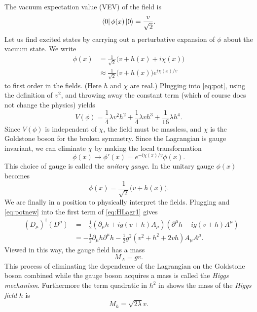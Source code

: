 The vacuum expectation value (VEV) of the field is
\begin{equation}
  \bra{0}\phi(x)\ket{0}=\frac{v}{\sqrt{2}}.
\end{equation}
Let us find excited states by carrying out a perturbative expansion of $\phi$ 
about the vacuum state. We write
\begin{equation}
  \label{eq:phixpand}
  \begin{aligned}
  \phi(x)&=\frac{1}{\sqrt{2}}\big(v+h(x)+i\chi(x)\big) \\
         &\approx\frac{1}{\sqrt{2}}\big(v+h(x)\big)
                  e^{i\chi(x)/v}
  \end{aligned}
\end{equation}
to first order in the fields. (Here $h$ and $\chi$ are real.) Plugging 
 into \eqref{eq:pot}, using the definition of 
$v^2$, and throwing away the constant term (which of course does not change the 
physics) yields
\begin{equation}
  \label{eq:potnew}
  V(\phi)=\frac{1}{4}\lambda v^{2}h^{2}+\frac{1}{4}\lambda vh^{3}
          +\frac{1}{16}\lambda h^{4}.
\end{equation}
Since $V(\phi)$ is independent of $\chi$, the field must be massless,
and $\chi$ is the Goldstone boson for the broken symmetry. Since the
Lagrangian is gauge invariant, we can eliminate $\chi$ by making the
local transformation
\begin{equation}
  \phi(x)\to\phi'(x)=e^{-i\chi(x)/v}\phi(x).
\end{equation}
This choice of gauge is called the {\it unitary gauge}. 
In the unitary gauge
$\phi(x)$ becomes
\begin{equation}
  \label{eq:phinew}
  \phi(x)=\frac{1}{\sqrt{2}}\big(v+h(x)\big).
\end{equation}
We are finally in a position to physically interpret the fields. Plugging 
 and \eqref{eq:potnew} into the first term of 
\eqref{eq:HLagr1} gives
\begin{equation}
  \label{eq:kin}
  \begin{aligned}
    -(D_{\mu})^{\dagger}(D^{\mu})&=-\frac{1}{2}(\partial_{\mu}h+ig(v+h)A_{\mu})
                                (\partial^{\mu}h-ig(v+h)A^{\mu}) \\
         &=-\frac{1}{2}\partial_{\mu}h\partial^{\mu}h 
           -\frac{1}{2}g^{2}(v^{2}+h^{2}+2vh)A_{\mu}A^{\mu}. 
  \end{aligned}
\end{equation} 
Viewed in this way, the gauge field has a mass
\begin{equation}
  M_{A}=gv.
\end{equation}
This process of eliminating the dependence of the Lagrangian on the Goldstone
boson combined while the gauge boson acquires a mass is called the {\it Higgs
mechanism}. Furthermore the term quadratic in 
$h^2$ in  shows the mass of the {\it Higgs field} 
$h$ is
\begin{equation}
  M_{h}=\sqrt{2\lambda}v.
\end{equation}

